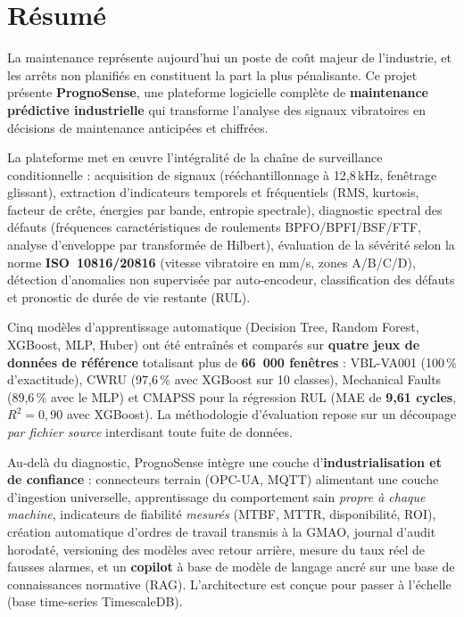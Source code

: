 \chapter*{Résumé}

La maintenance représente aujourd'hui un poste de coût majeur de l'industrie, et les
arrêts non planifiés en constituent la part la plus pénalisante. Ce projet présente
\textbf{PrognoSense}, une plateforme logicielle complète de \textbf{maintenance prédictive
industrielle} qui transforme l'analyse des signaux vibratoires en décisions de maintenance
anticipées et chiffrées.

La plateforme met en œuvre l'intégralité de la chaîne de surveillance conditionnelle :
acquisition de signaux (rééchantillonnage à 12{,}8\,kHz, fenêtrage glissant), extraction
d'indicateurs temporels et fréquentiels (RMS, kurtosis, facteur de crête, énergies par
bande, entropie spectrale), diagnostic spectral des défauts (fréquences caractéristiques
de roulements BPFO/BPFI/BSF/FTF, analyse d'enveloppe par transformée de Hilbert),
évaluation de la sévérité selon la norme \textbf{ISO~10816/20816} (vitesse vibratoire en
mm/s, zones A/B/C/D), détection d'anomalies non supervisée par auto-encodeur, classification
des défauts et pronostic de durée de vie restante (RUL).

Cinq modèles d'apprentissage automatique (Decision Tree, Random Forest, XGBoost, MLP,
Huber) ont été entraînés et comparés sur \textbf{quatre jeux de données de référence}
totalisant plus de \textbf{66~000 fenêtres} : VBL-VA001 (100\,\% d'exactitude), CWRU
(97{,}6\,\% avec XGBoost sur 10 classes), Mechanical Faults (89{,}6\,\% avec le MLP) et
CMAPSS pour la régression RUL (MAE de \textbf{9{,}61 cycles}, $R^2=0{,}90$ avec XGBoost).
La méthodologie d'évaluation repose sur un découpage \emph{par fichier source} interdisant
toute fuite de données.

Au-delà du diagnostic, PrognoSense intègre une couche d'\textbf{industrialisation et de
confiance} : connecteurs terrain (OPC-UA, MQTT) alimentant une couche d'ingestion
universelle, apprentissage du comportement sain \emph{propre à chaque machine}, indicateurs
de fiabilité \emph{mesurés} (MTBF, MTTR, disponibilité, ROI), création automatique d'ordres
de travail transmis à la GMAO, journal d'audit horodaté, versioning des modèles avec retour
arrière, mesure du taux réel de fausses alarmes, et un \textbf{copilot} à base de modèle de
langage ancré sur une base de connaissances normative (RAG). L'architecture est conçue pour
passer à l'échelle (base time-series TimescaleDB).

